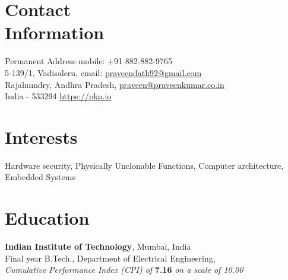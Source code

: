 \documentclass[margin,line]{resume}
\begin{document}


 \vspace{55mm}
\begin{resume}

\section{\mysidestyle Contact\\Information}

    {\sc Permanent Address}				\hfill {\sc mobile}: +91 882-882-9765								\vspace{0mm}\\\vspace{0mm}%
    5-139/1, Vadisaleru,				\hfill {\sc email}: \url{praveendath92@gmail.com}						\vspace{0mm}\\\vspace{0mm}%
    Rajahumdry, Andhra Pradesh,			\hfill {} \url{praveen@praveenkumar.co.in}								\vspace{0mm}\\\vspace{0mm}%
    India - 533294				\hfill {}\url{https://pkp.io}
        
\section{\mysidestyle Interests}
Hardware security, Physically Unclonable Functions, Computer architecture, Embedded Systems
\vspace{-2mm}

\section{\mysidestyle Education}
		
		{\bf Indian Institute of Technology}, Mumbai, India\\
		Final year B.Tech., Department of Electrical Engineering,\\
        \textit{\hspace*{2mm}Cumulative Performance Index (CPI) of} \textbf{7.16} \textit{on a scale of 10.00}
        \vspace{-2mm}
        

\end{resume}
\end{document}
